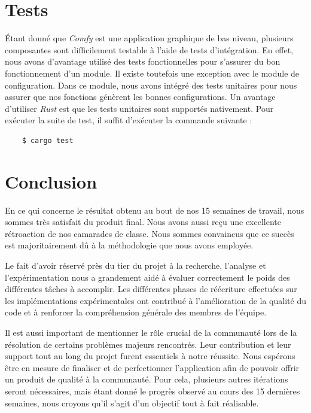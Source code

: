 \documentclass[titlepage]{article}
\begin{document}
\section{Tests}
Étant donné que \textit{Comfy} est une application graphique de bas niveau,
plusieurs composantes sont difficilement testable à l'aide de tests
d'intégration. En effet, nous avons d'avantage utilisé des tests fonctionnelles
pour s'assurer du bon fonctionnement d'un module. Il existe toutefois une
exception avec le module de configuration. Dans ce module, nous avons intégré
des tests unitaires pour nous assurer que nos fonctions génèrent les bonnes
configurations. Un avantage d'utiliser \textit{Rust} est que les tests unitaires
sont supportés nativement. Pour exécuter la suite de test, il suffit d'exécuter
la commande suivante :
\begin{verbatim}
	$ cargo test
\end{verbatim}

\section{Conclusion}
\par
En ce qui concerne le résultat obtenu au bout de nos 15 semaines de travail,
nous sommes très satisfait du produit final. Nous avons aussi reçu une
excellente rétroaction de nos camarades de classe. Nous sommes convaincus que ce
succès est majoritairement dû à la méthodologie que nous avons employée.
\bigskip

\par
Le fait d'avoir réservé près du tier du projet à la recherche, l'analyse et
l'expérimentation nous a grandement aidé à évaluer correctement le poids des
différentes tâches à accomplir. Les différentes phases de réécriture effectuées
sur les implémentations expérimentales ont contribué à l'amélioration de la
qualité du code et à renforcer la compréhension générale des membres de
l'équipe.
\bigskip

\par
Il est aussi important de mentionner le rôle crucial de la communauté lors de la
résolution de certains problèmes majeurs rencontrés. Leur contribution et leur
support tout au long du projet furent essentiels à notre réussite. Nous espérons
être en mesure de finaliser et de perfectionner l'application afin de pouvoir
offrir un produit de qualité à la communauté. Pour cela, plusieurs autres
itérations seront nécessaires, mais étant donné le progrès observé au cours des
15 dernières semaines, nous croyons qu'il s'agit d'un objectif tout à fait
réalisable.
\bigskip
\end{document}
